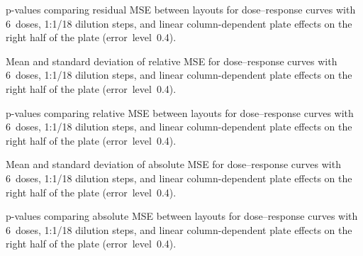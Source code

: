 \clearpage
\begin{table}[p]
    \centering
    \small
    
    \caption{p-values comparing residual MSE between layouts for dose--response curves with 6~doses, 1:1/18 dilution steps, and linear column-dependent plate effects on the right half of the plate (error~level~0.4).}
    \label{tab:dr-residuals-pvalues-6doses-dil18-half-columns-neg-controls-0.4}
\end{table}

\begin{table}[p]
    \centering
    \small
    
    \caption{Mean and standard deviation of relative \ECIC{} MSE for dose--response curves with 6~doses, 1:1/18 dilution steps, and linear column-dependent plate effects on the right half of the plate (error~level~0.4).}
    \label{tab:dr-relic50-mean-std-6doses-dil18-half-columns-neg-controls-0.4}
\end{table}

\begin{table}[p]
    \centering
    \small
    
    \caption{p-values comparing relative \ECIC{} MSE between layouts for dose--response curves with 6~doses, 1:1/18 dilution steps, and linear column-dependent plate effects on the right half of the plate (error~level~0.4).}
    \label{tab:dr-relic50-pvalues-6doses-dil18-half-columns-neg-controls-0.4}
\end{table}

\begin{table}[p]
    \centering
    \small
    
    \caption{Mean and standard deviation of absolute \ECIC{} MSE for dose--response curves with 6~doses, 1:1/18 dilution steps, and linear column-dependent plate effects on the right half of the plate (error~level~0.4).}
    \label{tab:dr-absic50-mean-std-6doses-dil18-half-columns-neg-controls-0.4}
\end{table}

\begin{table}[p]
    \centering
    \small
    
    \caption{p-values comparing absolute \ECIC{} MSE between layouts for dose--response curves with 6~doses, 1:1/18 dilution steps, and linear column-dependent plate effects on the right half of the plate (error~level~0.4).}
    \label{tab:dr-absic50-pvalues-6doses-dil18-half-columns-neg-controls-0.4}
\end{table}

